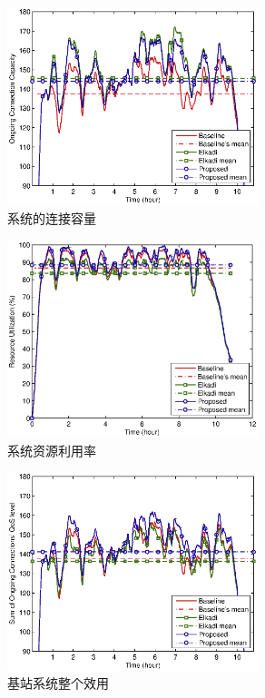 %
\begin{figure}[htbp]
\centering
\includegraphics[width=0.65\textwidth] {cacop_conns_sum.eps}
\caption{系统的连接容量}\label{fig:chap_cacop:clock_onging_call_sum}
\end{figure}

% 
\begin{figure}[htbp]
\centering
\includegraphics[width=0.65\textwidth]{cacop_bw_utilization.eps}
\caption{系统资源利用率}\label{fig:chap_cacop:clock_bs_availble_bw}
\end{figure}

%
\begin{figure}[htbp]
\centering
\includegraphics[width=0.65\textwidth] {cacop_qos_sum.eps}
\caption{基站系统整个效用}\label{fig:chap_cacop:clock_bs_qos_sum}
\end{figure}

